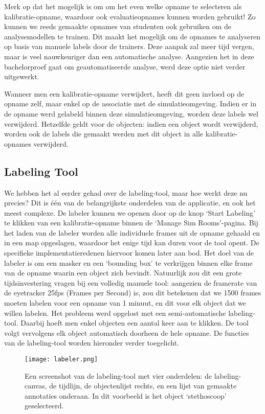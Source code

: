 Merk op dat het mogelijk is om om het even welke opname te selecteren als kalibratie-opname, waardoor ook evaluatieopnames kunnen worden gebruikt!
Zo kunnen we reeds gemaakte opnames van studenten ook gebruiken om de analysemodellen te trainen.
Dit maakt het mogelijk om de opnames te analyseren op basis van manuele labels door de trainers.
Deze aanpak zal meer tijd vergen, maar is veel nauwkeuriger dan een automatische analyse. Aangezien het in deze bachelorproef gaat om geautomatiseerde analyse, werd deze optie niet verder uitgewerkt.

Wanneer men een kalibratie-opname verwijdert, heeft dit geen invloed op de opname zelf, maar enkel op de associatie met de simulatieomgeving.
Indien er in de opname werd gelabeld binnen deze simulatieomgeving, worden deze labels wel verwijderd. 
Hetzelfde geldt voor de objecten: indien een object wordt verwijderd, worden ook de labels die gemaakt werden met dit object in alle kalibratie-opnames verwijderd.

\subsection{Labeling Tool}

We hebben het al eerder gehad over de labeling-tool, maar hoe werkt deze nu precies? Dit is één van de belangrijkste onderdelen van de applicatie, en ook het meest complexe.
De labeler kunnen we openen door op de knop `Start Labeling' te klikken van een kalibratie-opname binnen de `Manage Sim Rooms'-pagina.
Bij het laden van de labeler worden alle individuele frames uit de opname gehaald en in een map opgeslagen, waardoor het enige tijd kan duren voor de tool opent. De specifieke implementatieredenen hiervoor komen later aan bod.
Het doel van de labeler is om een masker en een `bounding box' te verkrijgen binnen elke frame van de opname waarin een object zich bevindt.
Natuurlijk zou dit een grote tijdsinvestering vragen bij een volledig manuele tool: aangezien de framerate van de eyetracker 25fps (Frames per Second) is, zou dit betekenen dat we 1500 frames moeten labelen voor een opname van 1 minuut, en dit voor elk object dat we willen labelen.
Het probleem werd opgelost met een semi-automatische labeling-tool. Daarbij hoeft men enkel objecten een aantal keer aan te klikken. De tool volgt vervolgens elk object automatisch doorheen de hele opname.
De functies van de labeling-tool worden hieronder verder toegelicht.

\begin{figure}[H]
  \centering
  \texttt{[image: labeler.png]}
  \caption[]{\label{fig:labeler} Een screenshot van de labeling-tool met vier onderdelen: de labeling-canvas, de tijdlijn, de objectenlijst rechts, en een lijst van gemaakte annotaties onderaan. In dit voorbeeld is het object `stethoscoop' geselecteerd. }
\end{figure}

